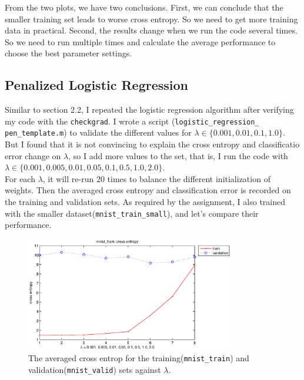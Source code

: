 \documentclass{article}
\begin{document}
From the two plots, we have two conclusions. First, we can conclude that the smaller training set leads to worse cross entropy. So we need to get more training data in practical. Second, the results change when we run the code several times. So we need to run multiple times and calculate the average performance to choose the best parameter settings.\\

\subsection{Penalized Logistic Regression}

Similar to section 2.2, I repeated the logistic regression algorithm after verifying my code with the \texttt{checkgrad}. I wrote a script (\texttt{logistic\_regression\_ pen\_template.m}) to validate the different values for $\lambda \in \{0.001, 0.01, 0.1, 1.0\}$. But I found that it is not convincing to explain the cross entropy and classificatio error change on $\lambda$, so I add more values to the set, that is, I run the code with $\lambda \in \{0.001, 0.005, 0.01, 0.05, 0.1, 0.5, 1.0, 2.0\}$. \\

For each $\lambda$, it will re-run 20 times to balance the different initialization of weights. Then the averaged cross entropy and classification error is recorded on the training and validation sets. As required by the assignment, I also trained with the smaller dataset(\texttt{mnist\_train\_small}), and let's compare their performance.\\

\begin{figure}[htb]
\centering
\includegraphics[width=\textwidth,height=5cm]{2-3-train-ce.eps}
\caption{The averaged cross entrop for the training(\texttt{mnist\_train}) and validation(\texttt{mnist\_valid}) sets against $\lambda$.
\label{fig:2-3-train-ce}}
\end{figure}
\end{document}
